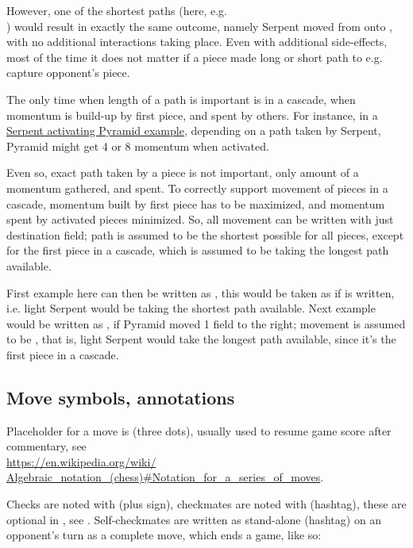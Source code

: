 However, one of the shortest paths (here, e.g. \\
) would result in exactly the same outcome, namely Serpent moved from
 onto , with no additional interactions taking place. Even with additional
side-effects, most of the time it does not matter if a piece made long or short path to e.g.
capture opponent's piece.

The only time when length of a path is important is in a cascade, when momentum is build-up
by first piece, and spent by others. For instance, in a
\hyperref[fig:scn_tr_12_serpent_path_short]{Serpent activating Pyramid example}, depending on
a path taken by Serpent, Pyramid might get 4 or 8 momentum when activated.

Even so, exact path taken by a piece is not important, only amount of a momentum gathered,
and spent. To correctly support movement of pieces in a cascade, momentum built by first
piece has to be maximized, and momentum spent by activated pieces minimized. So, all movement
can be written with just destination field; path is assumed to be the shortest possible for
all pieces, except for the first piece in a cascade, which is assumed to be taking the longest
path available.

First example here can then be written as , this would be taken as if
 is written, i.e. light Serpent would be taking the shortest path
available. Next example would be written as , if Pyramid moved 1 field
to the right; movement is assumed to be \alg{[Sc3.d4.c5.d6.e5.d4.c5.d6.c7]\~{}[Ac7-d7]},
that is, light Serpent would take the longest path available, since it's the first piece
in a cascade.

\subsection*{Move symbols, annotations}
\label{sec:Appendix/Notation/Move symbols, annotations}

Placeholder for a move is  (three dots), usually used to resume game score
after commentary, see \\
\href{https://en.wikipedia.org/wiki/Algebraic\_notation\_(chess)\#Notation\_for\_a\_series\_of\_moves}
{https://en.wikipedia.org/wiki/\\
Algebraic\_notation\_(chess)\#Notation\_for\_a\_series\_of\_moves}.

Checks are noted with \alg{+} (plus sign), checkmates are noted with \alg{\#} (hashtag),
these are optional in , see . Self-checkmates are written
as stand-alone \alg{\#} (hashtag) on an opponent's turn as a complete move, which ends
a game, like so:

